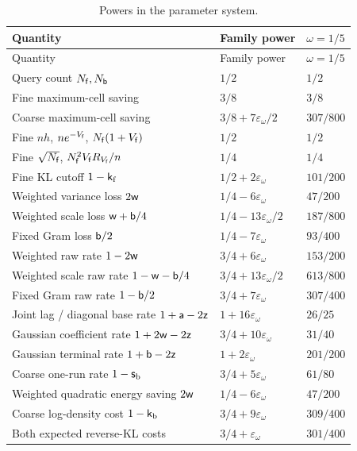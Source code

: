\begingroup
\small
\setlength{\tabcolsep}{4pt}
\begin{longtable}{@{}>{\raggedright\arraybackslash}p{}ll@{}}
\caption{Powers in the parameter system.}\label{u:tab:budget}\\
\toprule
Quantity & Family power & $\omega=1/5$\\
\midrule
\endfirsthead
\toprule
Quantity & Family power & $\omega=1/5$\\
\midrule
\endhead
\bottomrule
\endfoot
Query count $N_{\mathsf{f}},N_{\mathsf{b}}$ & $1/2$ & $1/2$\\
Fine maximum-cell saving & $3/8$ & $3/8$\\
Coarse maximum-cell saving & $3/8+7\varepsilon_\omega/2$ & $307/800$\\
Fine $nh$, $ne^{-V_{\mathsf{f}}}$, $N_{\mathsf{f}}(1+V_{\mathsf{f}})$ & $1/2$ & $1/2$\\
Fine $\sqrt{N_{\mathsf{f}}}$, $N_{\mathsf{f}}^2V_{\mathsf{f}}R_{V_{\mathsf{f}}}/n$ & $1/4$ & $1/4$\\
Fine KL cutoff $1-\mathsf{k}_{\rm f}$ & $1/2+2\varepsilon_\omega$ & $101/200$\\
Weighted variance loss $2\mathsf{w}$ & $1/4-6\varepsilon_\omega$ & $47/200$\\
Weighted scale loss $\mathsf{w}+\mathsf{b}/4$ & $1/4-13\varepsilon_\omega/2$ & $187/800$\\
Fixed Gram loss $\mathsf{b}/2$ & $1/4-7\varepsilon_\omega$ & $93/400$\\
Weighted raw rate $1-2\mathsf{w}$ & $3/4+6\varepsilon_\omega$ & $153/200$\\
Weighted scale raw rate $1-\mathsf{w}-\mathsf{b}/4$ & $3/4+13\varepsilon_\omega/2$ & $613/800$\\
Fixed Gram raw rate $1-\mathsf{b}/2$ & $3/4+7\varepsilon_\omega$ & $307/400$\\
Joint lag / diagonal base rate $1+\mathsf{a}-2\mathsf{z}$ & $1+16\varepsilon_\omega$ & $26/25$\\
Gaussian coefficient rate $1+2\mathsf{w}-2\mathsf{z}$ & $3/4+10\varepsilon_\omega$ & $31/40$\\
Gaussian terminal rate $1+\mathsf{b}-2\mathsf{z}$ & $1+2\varepsilon_\omega$ & $201/200$\\
Coarse one-run rate $1-\mathsf{s}_{\rm b}$ & $3/4+5\varepsilon_\omega$ & $61/80$\\
Weighted quadratic energy saving $2\mathsf{w}$ & $1/4-6\varepsilon_\omega$ & $47/200$\\
Coarse log-density cost $1-\mathsf{k}_{\rm b}$ & $3/4+9\varepsilon_\omega$ & $309/400$\\
Both expected reverse-KL costs & $3/4+\varepsilon_\omega$ & $301/400$\\

\end{longtable}
